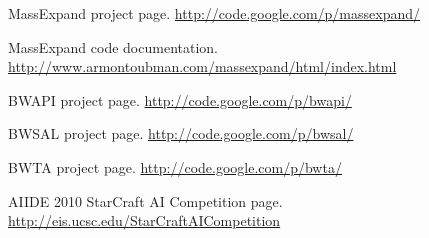 
\nocite{*}

\begin{thebibliography}{99}

	MassExpand project page.
	\url{http://code.google.com/p/massexpand/}

	MassExpand code documentation.
	\url{http://www.armontoubman.com/massexpand/html/index.html}

	BWAPI project page.
	\url{http://code.google.com/p/bwapi/}

	BWSAL project page.
	\url{http://code.google.com/p/bwsal/}

	BWTA project page.
	\url{http://code.google.com/p/bwta/}

	AIIDE 2010 StarCraft AI Competition page.
	\url{http://eis.ucsc.edu/StarCraftAICompetition}

\end{thebibliography}